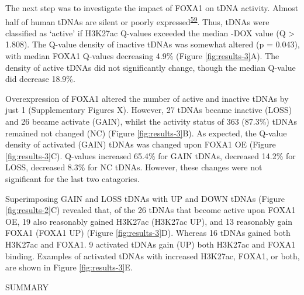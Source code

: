 \documentclass[
  12pt,
]{article}
\begin{document}
The next step was to investigate the impact of FOXA1 on tDNA activity.
Almost half of human tDNAs are silent or poorly expressed\textsuperscript{\protect\hyperlink{ref-Torres2019}{59}}.
Thus, tDNAs were classified as `active' if H3K27ac Q-values exceeded the median -DOX value (Q \textgreater{} 1.808).
The Q-value density of inactive tDNAs was somewhat altered (p = 0.043), with median FOXA1 Q-values decreasing 4.9\% (Figure \ref{fig:results-3}A).
The density of active tDNAs did not significantly change, though the median Q-value did decrease 18.9\%.

Overexpression of FOXA1 altered the number of active and inactive tDNAs by just 1 (Supplementary Figures X).
However, 27 tDNAs became inactive (LOSS) and 26 became activate (GAIN), whilst the activity status of 363 (87.3\%) tDNAs remained not changed (NC) (Figure \ref{fig:results-3}B).
As expected, the Q-value density of activated (GAIN) tDNAs was changed upon FOXA1 OE (Figure \ref{fig:results-3}C).
Q-values increased 65.4\% for GAIN tDNAs, decreased 14.2\% for LOSS, decreased 8.3\% for NC tDNAs.
However, these changes were not significant for the last two catagories.

Superimposing GAIN and LOSS tDNAs with UP and DOWN tDNAs (Figure \ref{fig:results-2}C) revealed that, of the 26 tDNAs that become active upon FOXA1 OE, 19 also reasonably gained H3K27ac (H3K27ac UP), and 13 reasonably gain FOXA1 (FOXA1 UP) (Figure \ref{fig:results-3}D).
Whereas 16 tDNAs gained both H3K27ac and FOXA1.
9 activated tDNAs gain (UP) both H3K27ac and FOXA1 binding.
Examples of activated tDNAs with increased H3K27ac, FOXA1, or both, are shown in Figure \ref{fig:results-3}E.

SUMMARY
\end{document}
